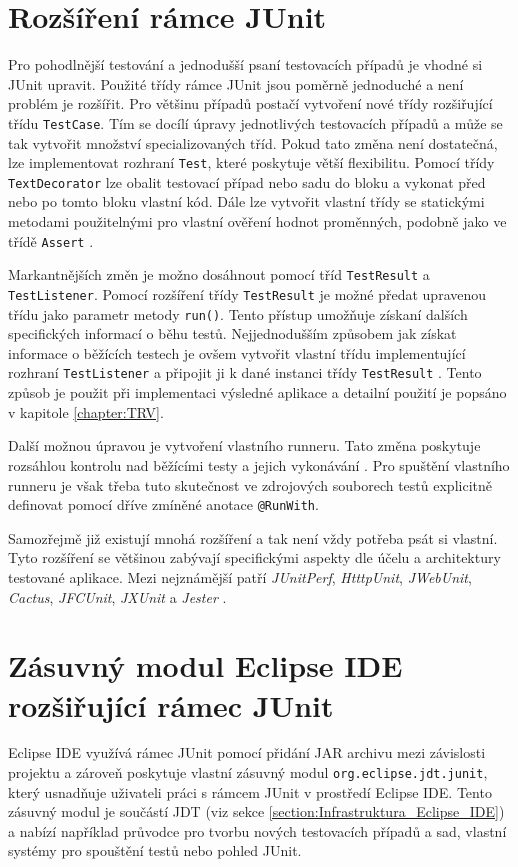   \section{Rozšíření rámce JUnit}
  Pro pohodlnější testování a jednodušší psaní testovacích případů je vhodné si JUnit upravit. Použité třídy rámce JUnit jsou poměrně jednoduché a není problém je rozšířit. Pro většinu případů postačí vytvoření nové třídy rozšiřující třídu \texttt{TestCase}. Tím se docílí úpravy jednotlivých testovacích případů a může se tak vytvořit množství specializovaných tříd. Pokud tato změna není dostatečná, lze implementovat rozhraní \texttt{Test}, které poskytuje větší flexibilitu. Pomocí třídy \texttt{TextDecorator} lze obalit testovací případ nebo sadu do bloku a vykonat před nebo po tomto bloku vlastní kód. Dále lze vytvořit vlastní třídy se statickými metodami použitelnými pro vlastní ověření hodnot proměnných, podobně jako ve třídě \texttt{Assert} \cite{JUnitGuide}.

  Markantnějších změn je možno dosáhnout pomocí tříd \texttt{TestResult} a \texttt{TestListener}. Pomocí rozšíření třídy \texttt{TestResult} je možné předat upravenou třídu jako parametr metody \texttt{run()}. Tento přístup umožňuje získaní dalších specifických informací o běhu testů. Nejjednodušším způsobem jak získat informace o běžících testech je ovšem vytvořit vlastní třídu implementující rozhraní \texttt{TestListener} a připojit ji k dané instanci třídy \texttt{TestResult} \cite{JUnitGuide}. Tento způsob je použit při implementaci výsledné aplikace a detailní použití je popsáno v kapitole \ref{chapter:TRV}.

  Další možnou úpravou je vytvoření vlastního runneru. Tato změna poskytuje rozsáhlou kontrolu nad běžícími testy a jejich vykonávání \cite{JUnitGuide}. Pro spuštění vlastního runneru je však třeba tuto skutečnost ve zdrojových souborech testů explicitně definovat pomocí dříve zmíněné anotace \texttt{@RunWith}.

  Samozřejmě již existují mnohá rozšíření a tak není vždy potřeba psát si vlastní. Tyto rozšíření se většinou zabývají specifickými aspekty dle účelu a architektury testované aplikace. Mezi nejznámější patří \emph{JUnitPerf}, \emph{HtttpUnit}, \emph{JWebUnit}, \emph{Cactus}, \emph{JFCUnit}, \emph{JXUnit} a \emph{Jester} \cite{JUnitGuide}.

  \section{Zásuvný modul Eclipse IDE rozšiřující rámec JUnit}
  Eclipse IDE využívá rámec JUnit pomocí přidání JAR archivu mezi závislosti projektu a zároveň poskytuje vlastní zásuvný modul \texttt{org.eclipse.jdt.junit}, který usnadňuje uživateli práci s rámcem JUnit v prostředí Eclipse IDE. Tento zásuvný modul je součástí JDT (viz sekce \ref{section:Infrastruktura_Eclipse_IDE}) a nabízí například průvodce pro tvorbu nových testovacích případů a sad, vlastní systémy pro spouštění testů nebo pohled JUnit.

